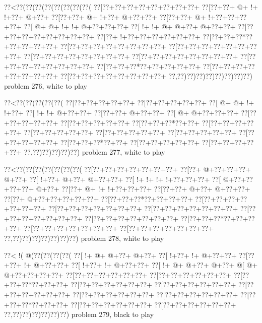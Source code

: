 \vbox{\vbox{\goo
\0??<\0??(\0??(\0??(\0??(\0??(\0??(\0??(\0??(
\0??[\0??+\0??+\0??+\0??+\0??+\0??+\0??+\0??+
\0??[\0??+\0??+\- @+\- !+\- !+\0??+\- @+\0??+
\0??[\0??+\0??+\- @+\- !+\0??+\- @+\0??+\0??+
\0??[\0??+\0??+\- @+\- !+\0??+\0??+\0??+\0??+
\0??[\- @+\- @+\- !+\- !+\- @+\0??+\0??+\0??+
\0??[\- !+\- !+\- @+\- @+\0??+\- @+\0??+\0??+
\0??[\0??+\0??+\0??+\0??+\0??+\0??+\0??+\0??+
\0??[\0??+\- !+\0??+\0??+\0??+\0??+\0??+\0??+
\0??[\0??+\0??+\0??*\0??+\0??+\0??+\0??+\0??+
\0??[\0??+\0??+\0??+\0??+\0??+\0??+\0??+\0??+
\0??[\0??+\0??+\0??+\0??+\0??+\0??+\0??+\0??+
\0??[\0??+\0??+\0??+\0??+\0??+\0??+\0??+\0??+
\0??[\0??+\0??+\0??+\0??+\0??+\0??+\0??+\0??+
\0??[\0??+\0??+\0??+\0??+\0??+\0??+\0??+\0??+
\0??[\0??+\0??+\0??*\0??+\0??+\0??+\0??+\0??+
\0??[\0??+\0??+\0??+\0??+\0??+\0??+\0??+\0??+
\0??[\0??+\0??+\0??+\0??+\0??+\0??+\0??+\0??+
\0??,\0??)\0??)\0??)\0??)\0??)\0??)\0??)\0??)
}
\hfil problem 276, white to play\hfil\break
}

\vbox{\vbox{\goo
\0??<\0??(\0??(\0??(\0??(\0??(
\0??[\0??+\0??+\0??+\0??+\0??+
\0??[\0??+\0??+\0??+\0??+\0??+
\0??[\- @+\- @+\- !+\- !+\0??+
\0??[\- !+\- !+\- @+\0??+\0??+
\0??[\0??+\0??+\- @+\0??+\0??+
\0??[\- @+\- @+\0??+\0??+\0??+
\0??[\0??+\0??+\0??+\0??+\0??+
\0??[\0??+\0??+\0??+\0??+\0??+
\0??[\0??+\0??+\0??*\0??+\0??+
\0??[\0??+\0??+\0??+\0??+\0??+
\0??[\0??+\0??+\0??+\0??+\0??+
\0??[\0??+\0??+\0??+\0??+\0??+
\0??[\0??+\0??+\0??+\0??+\0??+
\0??[\0??+\0??+\0??+\0??+\0??+
\0??[\0??+\0??+\0??*\0??+\0??+
\0??[\0??+\0??+\0??+\0??+\0??+
\0??[\0??+\0??+\0??+\0??+\0??+
\0??,\0??)\0??)\0??)\0??)\0??)
}
\hfil problem 277, white to play\hfil\break
}

\vbox{\vbox{\goo
\0??<\0??(\0??(\0??(\0??(\0??(\0??(\0??(
\0??[\0??+\0??+\0??+\0??+\0??+\0??+\0??+
\0??[\0??+\- @+\0??+\0??+\0??+\- @+\0??+
\0??[\- !+\0??+\- @+\0??+\- @+\0??+\0??+
\0??[\- !+\- !+\- !+\- !+\0??+\0??+\0??+
\0??[\- @+\0??+\0??+\0??+\0??+\- @+\0??+
\0??[\0??+\- @+\- !+\- !+\0??+\0??+\0??+
\0??[\0??+\0??+\- @+\0??+\- @+\0??+\0??+
\0??[\0??+\- @+\0??+\0??+\0??+\0??+\0??+
\0??[\0??+\0??+\0??*\0??+\0??+\0??+\0??+
\0??[\0??+\0??+\0??+\0??+\0??+\0??+\0??+
\0??[\0??+\0??+\0??+\0??+\0??+\0??+\0??+
\0??[\0??+\0??+\0??+\0??+\0??+\0??+\0??+
\0??[\0??+\0??+\0??+\0??+\0??+\0??+\0??+
\0??[\0??+\0??+\0??+\0??+\0??+\0??+\0??+
\0??[\0??+\0??+\0??*\0??+\0??+\0??+\0??+
\0??[\0??+\0??+\0??+\0??+\0??+\0??+\0??+
\0??[\0??+\0??+\0??+\0??+\0??+\0??+\0??+
\0??,\0??)\0??)\0??)\0??)\0??)\0??)\0??)
}
\hfil problem 278, white to play\hfil\break
}

\vbox{\vbox{\goo
\0??<\- !(\- @(\0??(\0??(\0??(\0??(
\0??[\- !+\- @+\- @+\0??+\- @+\0??+
\0??[\- !+\0??+\- !+\- @+\0??+\0??+
\0??[\0??+\0??+\- !+\- @+\0??+\0??+
\0??[\- !+\0??+\- !+\- @+\0??+\0??+
\0??[\- !+\- @+\- @+\0??+\- @+\0??+
\- @[\- @+\- @+\0??+\0??+\0??+\0??+
\0??[\0??+\0??+\0??+\0??+\0??+\0??+
\0??[\0??+\0??+\0??+\0??+\0??+\0??+
\0??[\0??+\0??+\0??*\0??+\0??+\0??+
\0??[\0??+\0??+\0??+\0??+\0??+\0??+
\0??[\0??+\0??+\0??+\0??+\0??+\0??+
\0??[\0??+\0??+\0??+\0??+\0??+\0??+
\0??[\0??+\0??+\0??+\0??+\0??+\0??+
\0??[\0??+\0??+\0??+\0??+\0??+\0??+
\0??[\0??+\0??+\0??*\0??+\0??+\0??+
\0??[\0??+\0??+\0??+\0??+\0??+\0??+
\0??[\0??+\0??+\0??+\0??+\0??+\0??+
\0??,\0??)\0??)\0??)\0??)\0??)\0??)
}
\hfil problem 279, black to play\hfil\break
}

